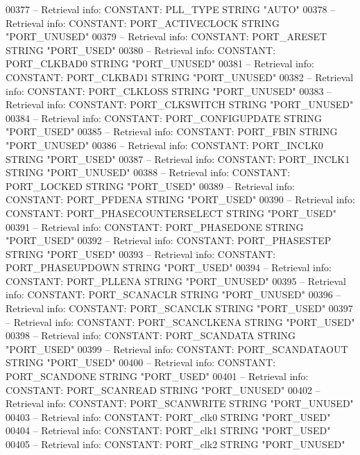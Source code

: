 \begin{DoxyCode}
{00377 \textcolor{keyword}{-- Retrieval info: CONSTANT: PLL\_TYPE STRING "AUTO"}
00378 \textcolor{keyword}{-- Retrieval info: CONSTANT: PORT\_ACTIVECLOCK STRING "PORT\_UNUSED"}
00379 \textcolor{keyword}{-- Retrieval info: CONSTANT: PORT\_ARESET STRING "PORT\_USED"}
00380 \textcolor{keyword}{-- Retrieval info: CONSTANT: PORT\_CLKBAD0 STRING "PORT\_UNUSED"}
00381 \textcolor{keyword}{-- Retrieval info: CONSTANT: PORT\_CLKBAD1 STRING "PORT\_UNUSED"}
00382 \textcolor{keyword}{-- Retrieval info: CONSTANT: PORT\_CLKLOSS STRING "PORT\_UNUSED"}
00383 \textcolor{keyword}{-- Retrieval info: CONSTANT: PORT\_CLKSWITCH STRING "PORT\_UNUSED"}
00384 \textcolor{keyword}{-- Retrieval info: CONSTANT: PORT\_CONFIGUPDATE STRING "PORT\_USED"}
00385 \textcolor{keyword}{-- Retrieval info: CONSTANT: PORT\_FBIN STRING "PORT\_UNUSED"}
00386 \textcolor{keyword}{-- Retrieval info: CONSTANT: PORT\_INCLK0 STRING "PORT\_USED"}
00387 \textcolor{keyword}{-- Retrieval info: CONSTANT: PORT\_INCLK1 STRING "PORT\_UNUSED"}
00388 \textcolor{keyword}{-- Retrieval info: CONSTANT: PORT\_LOCKED STRING "PORT\_USED"}
00389 \textcolor{keyword}{-- Retrieval info: CONSTANT: PORT\_PFDENA STRING "PORT\_USED"}
00390 \textcolor{keyword}{-- Retrieval info: CONSTANT: PORT\_PHASECOUNTERSELECT STRING "PORT\_USED"}
00391 \textcolor{keyword}{-- Retrieval info: CONSTANT: PORT\_PHASEDONE STRING "PORT\_USED"}
00392 \textcolor{keyword}{-- Retrieval info: CONSTANT: PORT\_PHASESTEP STRING "PORT\_USED"}
00393 \textcolor{keyword}{-- Retrieval info: CONSTANT: PORT\_PHASEUPDOWN STRING "PORT\_USED"}
00394 \textcolor{keyword}{-- Retrieval info: CONSTANT: PORT\_PLLENA STRING "PORT\_UNUSED"}
00395 \textcolor{keyword}{-- Retrieval info: CONSTANT: PORT\_SCANACLR STRING "PORT\_UNUSED"}
00396 \textcolor{keyword}{-- Retrieval info: CONSTANT: PORT\_SCANCLK STRING "PORT\_USED"}
00397 \textcolor{keyword}{-- Retrieval info: CONSTANT: PORT\_SCANCLKENA STRING "PORT\_USED"}
00398 \textcolor{keyword}{-- Retrieval info: CONSTANT: PORT\_SCANDATA STRING "PORT\_USED"}
00399 \textcolor{keyword}{-- Retrieval info: CONSTANT: PORT\_SCANDATAOUT STRING "PORT\_USED"}
00400 \textcolor{keyword}{-- Retrieval info: CONSTANT: PORT\_SCANDONE STRING "PORT\_USED"}
00401 \textcolor{keyword}{-- Retrieval info: CONSTANT: PORT\_SCANREAD STRING "PORT\_UNUSED"}
00402 \textcolor{keyword}{-- Retrieval info: CONSTANT: PORT\_SCANWRITE STRING "PORT\_UNUSED"}
00403 \textcolor{keyword}{-- Retrieval info: CONSTANT: PORT\_clk0 STRING "PORT\_USED"}
00404 \textcolor{keyword}{-- Retrieval info: CONSTANT: PORT\_clk1 STRING "PORT\_USED"}
00405 \textcolor{keyword}{-- Retrieval info: CONSTANT: PORT\_clk2 STRING "PORT\_UNUSED"}
}
\end{DoxyCode}
